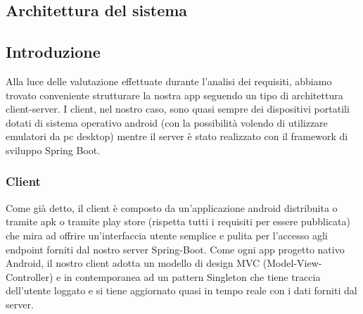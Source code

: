 \subsection{Architettura del sistema}

\subsection{Introduzione}
\begin{flushleft}
    Alla luce delle valutazione effettuate durante l'analisi dei requisiti, abbiamo trovato conveniente strutturare la nostra app seguendo un tipo di 
    architettura client-server. I client, nel nostro caso, sono quasi sempre dei dispositivi portatili dotati di sistema operativo android (con la possibilità volendo di utilizzare emulatori da pc desktop)
    mentre il server è stato realizzato con il framework di sviluppo Spring Boot.

\end{flushleft}

\subsubsection{Client}
\begin{flushleft}
    Come già detto, il client è composto da un'applicazione android distribuita o tramite apk o tramite play store (rispetta tutti i requisiti per essere pubblicata) che mira ad offrire un'interfaccia utente semplice e pulita 
    per l'accesso agli endpoint forniti dal nostro server Spring-Boot. Come ogni app progetto nativo Android, il nostro client adotta un modello di design MVC (Model-View-Controller) e 
    in contemporanea ad un pattern Singleton che tiene traccia dell'utente loggato e si tiene aggiornato quasi in tempo reale con i dati forniti dal server.
\end{flushleft}
\vspace{0.2cm}


